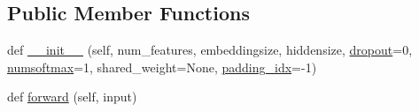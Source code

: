 \subsection*{Public Member Functions}
\begin{DoxyCompactItemize}
\item 
def \hyperlink{classparlai_1_1agents_1_1seq2seq_1_1modules_1_1OutputLayer_ae79d593ea8038932fc431369de1fa91d}{\+\_\+\+\_\+init\+\_\+\+\_\+} (self, num\+\_\+features, embeddingsize, hiddensize, \hyperlink{classparlai_1_1agents_1_1seq2seq_1_1modules_1_1OutputLayer_aa9bb2d06eae7ebeb2fc1d2d0a27e0c3b}{dropout}=0, \hyperlink{classparlai_1_1agents_1_1seq2seq_1_1modules_1_1OutputLayer_a1a08bf54424b676bb5f35aa2ca8dc096}{numsoftmax}=1, shared\+\_\+weight=None, \hyperlink{classparlai_1_1agents_1_1seq2seq_1_1modules_1_1OutputLayer_acc82ef26b2a162662c729fc325d39b54}{padding\+\_\+idx}=-\/1)
\item 
def \hyperlink{classparlai_1_1agents_1_1seq2seq_1_1modules_1_1OutputLayer_a730001f010633b53df7f7d96a75d8812}{forward} (self, input)
\end{DoxyCompactItemize}
